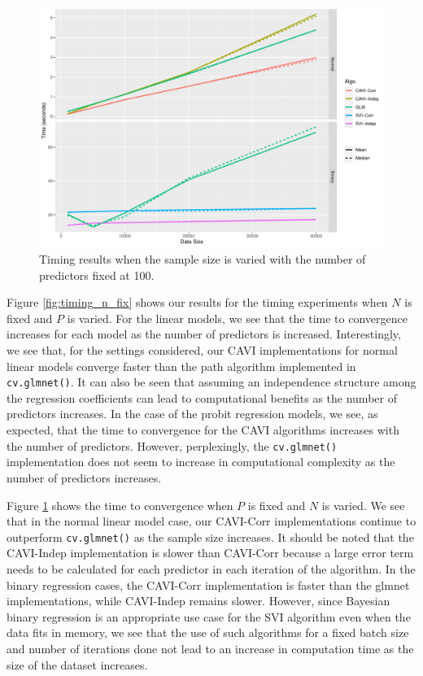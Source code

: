 \documentclass[]{article}
\let\code=\texttt
\newcommand{\fct}[1]{\code{#1()}}
\newcommand{\pkg}[1]{{\fontseries{b}\selectfont #1}}
\begin{document}
\begin{figure}
	\centering
	\includegraphics[scale=0.5]{timing_p_fix.pdf}
	\caption{Timing results when the sample size is varied with the number 
		of predictors fixed at 100.}	\label{fig:timing_p_fix}
\end{figure}

Figure \ref{fig:timing_n_fix} shows our results for the timing experiments when
$N$ is fixed and $P$ is varied. For the linear models, we see that the time to
convergence increases for each model as the number of predictors is increased.
Interestingly, we see that, for the settings considered, our CAVI
implementations for normal linear models converge faster than the path algorithm
implemented in \fct{cv.glmnet}. It can also be seen that assuming an
independence structure among the regression coefficients can lead to
computational benefits as the number of predictors increases. In the case of the
probit regression models, we see, as expected, that the time to convergence for
the CAVI algorithms increases with the number of predictors. However,
perplexingly, the \fct{cv.glmnet} implementation does not seem to increase in
computational complexity as the number of predictors increases.

Figure \ref{fig:timing_p_fix} shows the time to convergence when $P$ is fixed
and $N$ is varied. We see that in the normal linear model case, our CAVI-Corr
implementations continue to outperform \fct{cv.glmnet} as the sample size
increases. It should be noted that the CAVI-Indep implementation is slower than
CAVI-Corr because a large error term needs to be calculated for each predictor
in each iteration of the algorithm. In the binary regression cases, the
CAVI-Corr implementation is faster than the \pkg{glmnet} implementations, while
CAVI-Indep remains slower. However, since Bayesian binary regression is an
appropriate use case for the SVI algorithm even when the data fits in memory, we
see that the use of such algorithms for a fixed batch size and number of
iterations done not lead to an increase in computation time as the size of the
dataset increases. 
\end{document}
